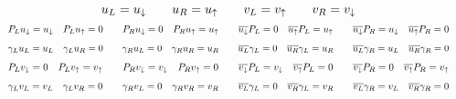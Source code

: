 \begin{gather*}
        u_L = u_\downarrow
        \qquad
        u_R = u_\uparrow
        \qquad
        v_L = v_\uparrow
        \qquad
        v_R = v_\downarrow
        \\
        \resizebox{\linewidth}{!}{$\displaystyle
                P_Lu_\downarrow = u_\downarrow
                \quad
                P_Lu_\uparrow = 0
                \qquad
                P_Ru_\downarrow = 0
                \quad
                P_Ru_\uparrow = u_\uparrow
                \qquad
                \overline{u_\downarrow}P_L = 0
                \quad
                \overline{u_\uparrow}P_L = u_\uparrow
                \qquad
                \overline{u_\downarrow}P_R = u_\downarrow
                \quad
                \overline{u_\uparrow}P_R = 0
        $}
        \\\resizebox{\linewidth}{!}{$\displaystyle
                \gamma_Lu_L = u_L
                \quad
                \gamma_Lu_R = 0
                \qquad
                \gamma_Ru_L = 0
                \quad
                \gamma_Ru_R = u_R
                \qquad
                \overline{u_L}\gamma_L = 0
                \quad
                \overline{u_R}\gamma_L = u_R
                \qquad
                \overline{u_L}\gamma_R = u_L
                \quad
                \overline{u_R}\gamma_R = 0
        $}
        \\\resizebox{\linewidth}{!}{$\displaystyle
                P_Lv_\downarrow = 0
                \quad
                P_Lv_\uparrow = v_\uparrow
                \qquad
                P_Rv_\downarrow = v_\downarrow
                \quad
                P_Rv_\uparrow = 0
                \qquad
                \overline{v_\downarrow}P_L = v_\downarrow
                \quad
                \overline{v_\uparrow}P_L = 0
                \qquad
                \overline{v_\downarrow}P_R = 0
                \quad
                \overline{v_\uparrow}P_R =v_\uparrow
        $}
        \\\resizebox{\linewidth}{!}{$\displaystyle
                \gamma_Lv_L = v_L
                \quad
                \gamma_Lv_R = 0
                \qquad
                \gamma_Rv_L = 0
                \quad
                \gamma_Rv_R = v_R
                \qquad
                \overline{v_L}\gamma_L = 0
                \quad
                \overline{v_R}\gamma_L = v_R
                \qquad
                \overline{v_L}\gamma_R = v_L
                \quad
                \overline{v_R}\gamma_R = 0
        $}
\end{gather*}

